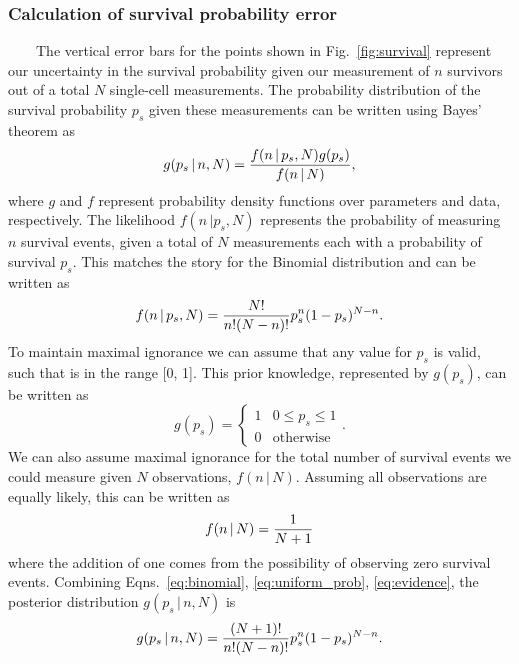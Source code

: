 \subsubsection{Calculation
of
survival
probability
error}\label{calculation-of-survival-probability-error}

~~~~The
vertical
error
bars
for
the
points
shown
in
Fig.~\ref{fig:survival}
represent
our
uncertainty
in the
survival
probability
given
our
measurement
of
\(n\)
survivors
out of
a
total
\(N\)
single-cell
measurements.
The
probability
distribution
of the
survival
probability
\(p_s\)
given
these
measurements
can be
written
using
Bayes'
theorem
as
\begin{equation}
g(p_s\,\vert\, n, N) = {f(n\,\vert\,p_s, N)g(p_s) \over f(n\,\vert\, N)},
\label{eq:probability_bayes}\end{equation}
where
\(g\)
and
\(f\)
represent
probability
density
functions
over
parameters
and
data,
respectively.
The
likelihood
\(f(n\,\vert p_s, N)\)
represents
the
probability
of
measuring
\(n\)
survival
events,
given
a
total
of
\(N\)
measurements
each
with a
probability
of
survival
\(p_s\).
This
matches
the
story
for
the
Binomial
distribution
and
can be
written
as
\begin{equation}
f(n\,\vert\,p_s, N) = {N! \over n!(N - n)!}p_s^n(1 - p_s)^{N - n}.
\label{eq:binomial}\end{equation}
To
maintain
maximal
ignorance
we can
assume
that
any
value
for
\(p_s\)
is
valid,
such
that
is in
the
range
{[}0,
1{]}.
This
prior
knowledge,
represented
by
\(g(p_s)\),
can be
written
as
\begin{equation}
g(p_s) = \begin{cases}1 & 0\leq p_s\leq 1 \\
0 & \text{otherwise} \end{cases}.
\label{eq:uniform_prob}\end{equation}
We can
also
assume
maximal
ignorance
for
the
total
number
of
survival
events
we
could
measure
given
\(N\)
observations,
\(f(n\, \vert\, N)\).
Assuming
all
observations
are
equally
likely,
this
can be
written
as
\begin{equation}
f(n\,\vert\, N) = {1 \over N + 1}
\label{eq:evidence}\end{equation}
where
the
addition
of one
comes
from
the
possibility
of
observing
zero
survival
events.
Combining
Eqns.~\ref{eq:binomial}, \ref{eq:uniform_prob}, \ref{eq:evidence},
the
posterior
distribution
\(g(p_s\,\vert\, n, N)\)
is
\begin{equation}
g(p_s\,\vert\, n, N) = {(N+1)! \over n!(N - n)!}p_s^{n}(1 - p_s)^{N - n}.
\label{eq:probability_posterior}\end{equation}

